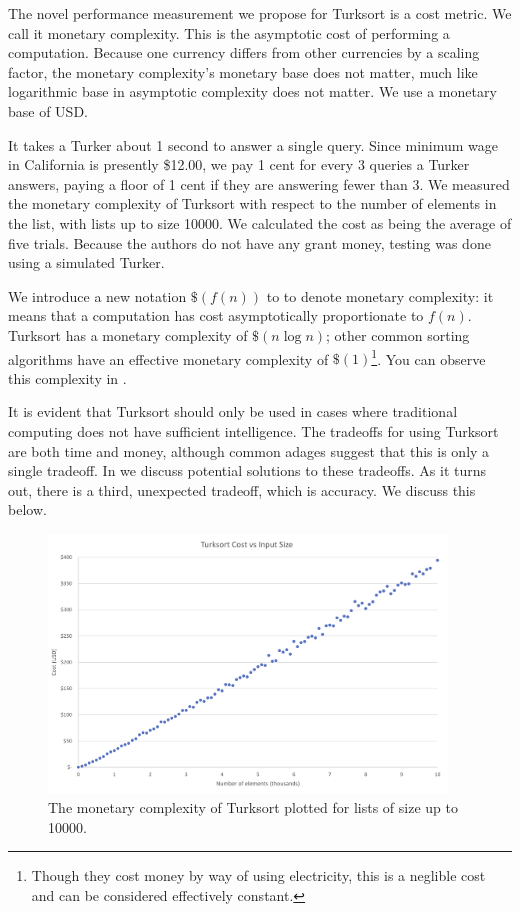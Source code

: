 \documentclass{article}
\begin{document}
The novel performance measurement we propose for Turksort is a cost metric. We
call it monetary complexity. This is the asymptotic cost of performing a
computation. Because one currency differs from other currencies by a scaling
factor, the monetary complexity's monetary base does not matter, much like
logarithmic base in asymptotic complexity does not matter. We use a monetary
base of USD.

It takes a Turker about 1 second to answer a single query. Since minimum wage in
California is presently \$12.00, we pay 1 cent for every 3 queries a Turker
answers, paying a floor of 1 cent if they are answering fewer than 3. We
measured the monetary complexity of Turksort with respect to the number of
elements in the list, with lists up to size 10000. We calculated the cost as
being the average of five trials. Because the authors do not have any grant
money, testing was done using a simulated Turker.

We introduce a new notation \(\$(f(n))\) to to denote monetary complexity: it
means that a computation has cost asymptotically proportionate to \(f(n)\).
Turksort has a monetary complexity of \(\$(n \log n)\); other common sorting
algorithms have an effective monetary complexity of \(\$(1)\)\footnote{Though
  they cost money by way of using electricity, this is a neglible cost and can
  be considered effectively constant.}. You can observe this complexity in
.

It is evident that Turksort should only be used in cases where traditional
computing does not have sufficient intelligence. The tradeoffs for using
Turksort are both time and money, although common adages suggest that this is
only a single tradeoff. In  we discuss potential solutions
to these tradeoffs. As it turns out, there is a third, unexpected tradeoff,
which is accuracy. We discuss this below.

\begin{figure}
  \centering
  \includegraphics[width=300pt]{costs.png}
  \caption{The monetary complexity of Turksort plotted for lists of size up to
    10000.}
  \label{fig:costs}
\end{figure}
\end{document}
